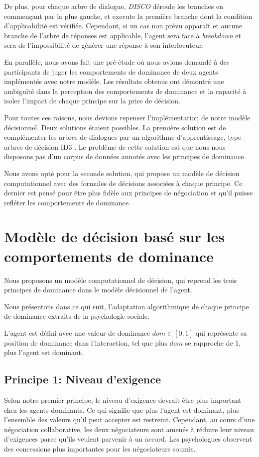 		De plus, pour chaque arbre de dialogue, \emph{DISCO} déroule les branches en commençant par la plus gauche, et execute la première branche dont la condition d'applicabilité est vérifiée. Cependant, si un cas non prévu apparaît et aucune branche de l'arbre de réponses est applicable, l'agent sera face à \textit{breakdown} et sera de l'impossibilité de générer une réponse à son interlocuteur. 
		
		En parallèle, nous avons fait une pré-étude où nous avions demandé à des participants de juger les comportements de dominance de deux agents implémentés avec notre modèle. Les résultats obtenus ont démontré une ambiguïté dans la perception des comportements de dominance et la capacité à isoler l'impact de chaque principe sur la prise de décision.
		
		Pour toutes ces raisons, nous devions repenser l'implémentation de notre modèle décisionnel. Deux solutions étaient possibles. La première solution est de complémenter les arbres de dialogues par un algorithme d'apprentissage, type arbres de décision ID3 \cite{utgoff1989incremental}. Le problème de cette solution est que nous nous disposons pas d'un corpus de données annotés avec les principes de dominance. 
		
		Nous avons opté pour la seconde solution, qui propose un modèle de décision computationnel avec des formules de décisions associées à chaque principe. 
		Ce dernier est pensé pour être plus fidèle aux principes de négociation et qu'il puisse refléter les comportements de dominance. 
	
	\section[Modèle de décision]{Modèle de décision basé sur les comportements de dominance}
	
	Nous proposons un modèle computationnel de décision, qui reprend les trois principes de dominance dans le modèle décisionnel de l'agent. 
	
	Nous présentons dans ce qui suit, l'adaptation algorithmique de chaque principe de dominance extraits de la psychologie sociale.
	
	L'agent est défini avec une valeur de dominance $dom \in [0,1]$ qui représente sa position de dominance dans l'interaction, tel que plus $dom$ se rapproche de 1, plus l'agent est dominant. 
	
	\subsection{Principe 1: Niveau d'exigence}
	\label{sec:concessions}
	Selon notre premier principe, le niveau d'exigence devrait être plus important chez les agents dominants. Ce qui signifie que plus l'agent est dominant, plus l'ensemble des valeurs qu'il peut accepter est restreint.
	Cependant, au cours d'une négociation collaborative, les deux négociateurs sont amenés à réduire leur niveau d'exigences parce qu'ils veulent parvenir à un accord. Les psychologues observent des concessions plus importantes pour les négociateurs soumis. 
	
